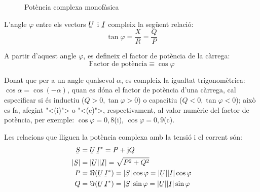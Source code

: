 \begin{figure}[htb]
\centering
{}
\caption{Pot\`{e}ncia complexa monof\`{a}sica} \label{pic:pot_comp_mono}
\end{figure}

L'angle $\varphi$ entre els vectors $\cmplx{U}$ i $\cmplx{I}$ compleix la seg\"{u}ent relaci\'{o}:
\begin{equation}
   \tan\varphi = \frac{X}{R} = \frac{Q}{P}
\end{equation}

A partir d'aquest angle $\varphi$, es defineix el factor de pot\`{e}ncia de la c\`{a}rrega:
\begin{equation}
   \text{Factor de pot\`{e}ncia} \equiv \cos\varphi
\end{equation}

Donat que per a un angle qualsevol $\alpha$, es compleix la igualtat
trigonom\`{e}trica: $\cos\alpha = \cos(-\alpha)$, quan es d\'{o}na el factor
de pot\`{e}ncia d'una c\`{a}rrega, cal especificar si \'{e}s inductiu ($Q>0,
\tan\varphi>0$) o capacitiu ($Q<0, \tan\varphi<0$); aix\`{o} es fa,
afegint {"<}(i){">} o {"<}(c){">}, respectivament, al valor num\`{e}ric del factor
de pot\`{e}ncia, per exemple: $\cos\varphi=0,8$(i),
$\cos\varphi=0,9$(c).

Les relacions que lliguen la pot\`{e}ncia complexa amb la tensi\'{o} i el corrent s\'{o}n:
\begin{align}
   \cmplx{S} &=  \cmplx{U} \,\cmplx{I}^* = P + \ju Q \\
   |\cmplx{S}| &= |\cmplx{U}| |\cmplx{I}| = \sqrt{P^2+Q^2} \\
   P &= \Re (\cmplx{U} \, \cmplx{I}^*) = |\cmplx{S}| \cos\varphi =
   |\cmplx{U}| |\cmplx{I}| \cos\varphi\\
   Q &= \Im (\cmplx{U} \, \cmplx{I}^*) = |\cmplx{S}| \sin\varphi =
   |\cmplx{U}| |\cmplx{I}|\sin\varphi
\end{align}

